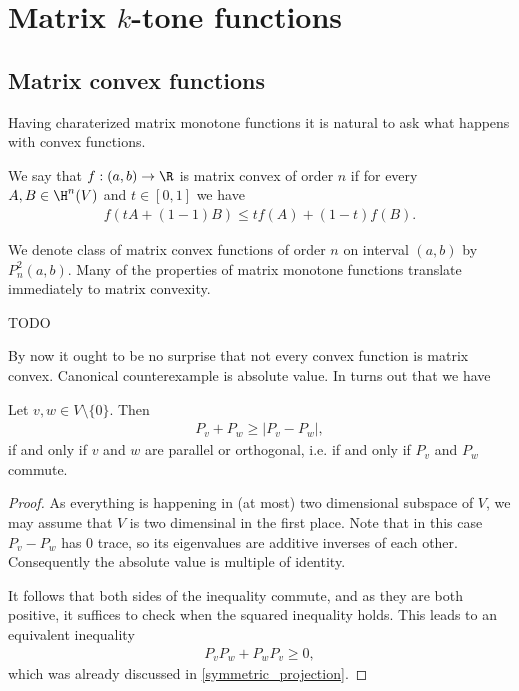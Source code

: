 \chapter{Matrix $k$-tone functions}

\section{Matrix convex functions}

Having charaterized matrix monotone functions it is natural to ask what happens with convex functions.

\begin{maar}
	We say that $f : (a, b) \to \R$ is matrix convex of order $n$ if for every $A, B \in \H^{n}(V)$ and $t \in [0, 1]$ we have
	\begin{align*}
		f(t A + (1 - 1) B) \leq t f(A) + (1 - t) f(B).
	\end{align*}
\end{maar}

We denote class of matrix convex functions of order $n$ on interval $(a, b)$ by $P^{2}_{n}(a, b)$. Many of the properties of matrix monotone functions translate immediately to matrix convexity.

\begin{prop}
	TODO
\end{prop}

By now it ought to be no surprise that not every convex function is matrix convex. Canonical counterexample is absolute value. In turns out that we have

\begin{prop}
	Let $v, w \in V \setminus \{0\}$. Then
	\begin{align*}
	P_{v} + P_{w} \geq |P_{v} - P_{w}|,
	\end{align*}
	if and only if $v$ and $w$ are parallel or orthogonal, i.e. if and only if $P_{v}$ and $P_{w}$ commute.
\end{prop}
\begin{proof}
	As everything is happening in (at most) two dimensional subspace of $V$, we may assume that $V$ is two dimensinal in the first place. Note that in this case $P_{v} - P_{w}$ has $0$ trace, so its eigenvalues are additive inverses of each other. Consequently the absolute value is multiple of identity.

	It follows that both sides of the inequality commute, and as they are both positive, it suffices to check when the squared inequality holds. This leads to an equivalent inequality
	\begin{align*}
		P_{v} P_{w} + P_{w} P_{v} \geq 0,
	\end{align*}
	which was already discussed in \ref{symmetric_projection}.
\end{proof}


